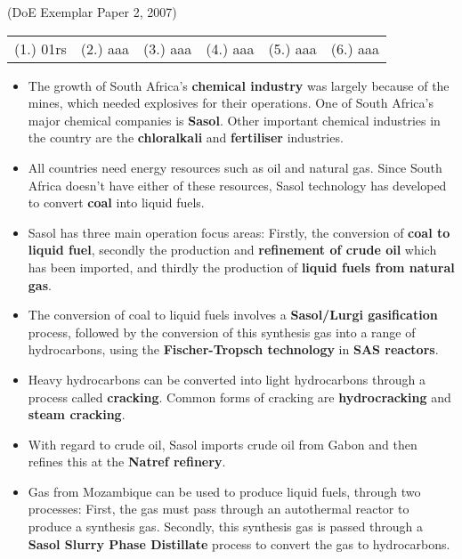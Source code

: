 {(DoE Exemplar Paper 2, 2007)

\par \practiceinfo
\par \begin{tabular}[h]{cccccc}
(1.)	01rs	&
(2.)	aaa	&
(3.)	aaa	&
(4.)	aaa	&
(5.)	aaa	&
(6.)	aaa	\\
\end{tabular}
}


\begin{itemize}
\item{The growth of South Africa's \textbf{chemical industry} was largely because of the mines, which needed explosives for their operations. One of South Africa's major chemical companies is \textbf{Sasol}. Other important chemical industries in the country are the \textbf{chloralkali} and \textbf{fertiliser} industries.}
\item{All countries need energy resources such as oil and natural gas. Since South Africa doesn't have either of these resources, Sasol technology has developed to convert \textbf{coal} into liquid fuels.}
\item{Sasol has three main operation focus areas: Firstly, the conversion of \textbf{coal to liquid fuel}, secondly the production and \textbf{refinement of crude oil} which has been imported, and thirdly the production of \textbf{liquid fuels from natural gas}.}
\item{The conversion of coal to liquid fuels involves a \textbf{Sasol/Lurgi gasification} process, followed by the conversion of this synthesis gas into a range of hydrocarbons, using the \textbf{Fischer-Tropsch technology} in \textbf{SAS reactors}.}
\item{Heavy hydrocarbons can be converted into light hydrocarbons through a process called \textbf{cracking}. Common forms of cracking are \textbf{hydrocracking} and \textbf{steam cracking}.}
\item{With regard to crude oil, Sasol imports crude oil from Gabon and then refines this at the \textbf{Natref refinery}.}
\item{Gas from Mozambique can be used to produce liquid fuels, through two processes: First, the gas must pass through an autothermal reactor to produce a synthesis gas. Secondly, this synthesis gas is passed through a \textbf{Sasol Slurry Phase Distillate} process to convert the gas to hydrocarbons.}

\end{itemize}

